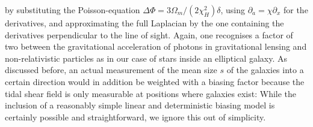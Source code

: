 \documentclass[a4paper,fleqn,usenatbib]{mnras}
\begin{document}
by substituting the Poisson-equation $\Delta\Phi = 3\Omega_m/(2\chi_H^2)\delta$, using $\partial_a = \chi\partial_x$ for the derivatives, and approximating the full Laplacian by the one containing the derivatives perpendicular to the line of sight. Again, one recognises a factor of two between the gravitational acceleration of photons in gravitational lensing and non-relativistic particles as in our case of stars inside an elliptical galaxy. As discussed before, an actual measurement of the mean size $s$ of the galaxies into a certain direction would in addition be weighted with a biasing factor because the tidal shear field is only measurable at positions where galaxies exist: While the inclusion of a reasonably simple linear and deterministic biasing model is certainly possible and straightforward, we ignore this out of simplicity. 
\end{document}
